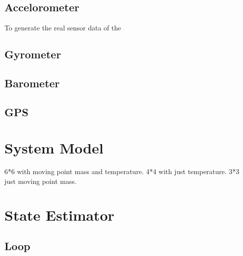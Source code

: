 \subsection{Accelorometer}
To generate the real sensor data of the 

\subsection{Gyrometer}

\subsection{Barometer}

\subsection{GPS}





\section{System Model}
6*6 with moving point mass and temperature.
4*4 with just temperature.
3*3 just moving point mass.

\section{State Estimator}
\subsection{}
\subsection{Loop}
